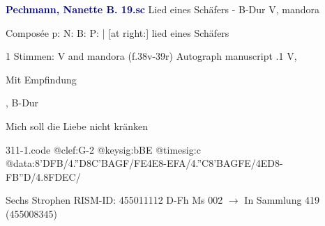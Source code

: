 \documentclass[twocolumn]{book}
\begin{document}
\newline \par \vspace{7pt} \textcolor{darkblue}{\textbf{Pechmann, Nanette B.  19.sc}}
\newline Lied eines Schäfers - B-Dur
\newline V, mandora
\newline \begin{itshape}[heading, f.38v:] Composée p: N: B: P: | [at right:] lied eines Schäfers\end{itshape} 
\newline \textcolor{darkblue}{}  1 Stimmen: V and mandora  (f.38v-39r)
\newline Autograph manuscript
.1  V, \begin{itshape}Mit Empfindung\end{itshape}, B-Dur
\newline \begin{footnotesize} Mich soll die Liebe nicht kränken \end{footnotesize}  
\begin{filecontents*}{311-1.code}
@clef:G-2
@keysig:bBE
@timesig:c
@data:8'DFB/4.''D8C'BAGF/{FE}4E8-EFA/4.''C8'BAGFE/4ED8-FB''D/4.8FDEC/
\end{filecontents*}
\newline
%
\newline Sechs Strophen
\newline RISM-ID: 455011112
\newline D-Fh  Ms 002
\newline $\rightarrow$ In Sammlung 419 (455008345)
      
\end{document}
